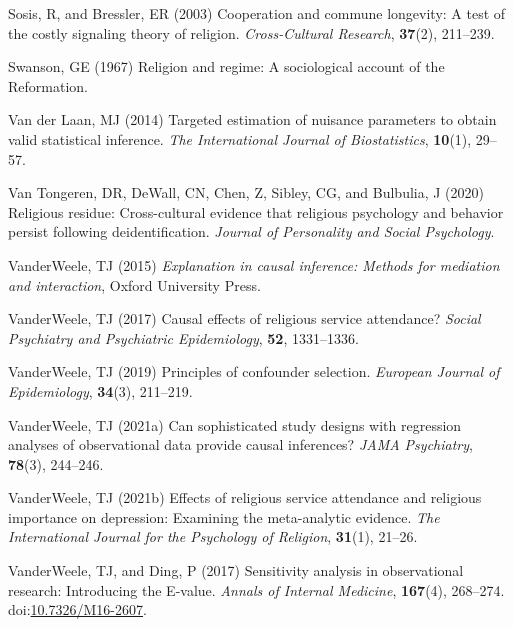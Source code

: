 \documentclass[
  single column]{article}
\newlength{\cslhangindent}
\newenvironment{CSLReferences}[2] %
 {\begin{list}{}{%
  \setlength{\itemindent}{0pt}
  \setlength{\leftmargin}{0pt}
  \setlength{\parsep}{0pt}
  \ifodd #1
   \setlength{\leftmargin}{\cslhangindent}
   \setlength{\itemindent}{-1\cslhangindent}
  \fi
  \setlength{\itemsep}{#2\baselineskip}}}
 {\end{list}}
\begin{document}
\begin{CSLReferences}{1}{0}
Sosis, R, and Bressler, ER (2003) Cooperation and commune longevity: A
test of the costly signaling theory of religion. \emph{Cross-Cultural
Research}, \textbf{37}(2), 211--239.

Swanson, GE (1967) Religion and regime: A sociological account of the
{R}eformation.

Van der Laan, MJ (2014) Targeted estimation of nuisance parameters to
obtain valid statistical inference. \emph{The International Journal of
Biostatistics}, \textbf{10}(1), 29--57.

Van Tongeren, DR, DeWall, CN, Chen, Z, Sibley, CG, and Bulbulia, J
(2020) Religious residue: Cross-cultural evidence that religious
psychology and behavior persist following deidentification.
\emph{Journal of Personality and Social Psychology}.

VanderWeele, TJ (2015) \emph{Explanation in causal inference: Methods
for mediation and interaction}, Oxford University Press.

VanderWeele, TJ (2017) Causal effects of religious service attendance?
\emph{Social Psychiatry and Psychiatric Epidemiology}, \textbf{52},
1331--1336.

VanderWeele, TJ (2019) Principles of confounder selection.
\emph{European Journal of Epidemiology}, \textbf{34}(3), 211--219.

VanderWeele, TJ (2021a) Can sophisticated study designs with regression
analyses of observational data provide causal inferences? \emph{JAMA
Psychiatry}, \textbf{78}(3), 244--246.

VanderWeele, TJ (2021b) Effects of religious service attendance and
religious importance on depression: Examining the meta-analytic
evidence. \emph{The International Journal for the Psychology of
Religion}, \textbf{31}(1), 21--26.

VanderWeele, TJ, and Ding, P (2017) Sensitivity analysis in
observational research: Introducing the {E}-value. \emph{Annals of
Internal Medicine}, \textbf{167}(4), 268--274.
doi:\href{https://doi.org/10.7326/M16-2607}{10.7326/M16-2607}.


\end{CSLReferences}
\end{document}
